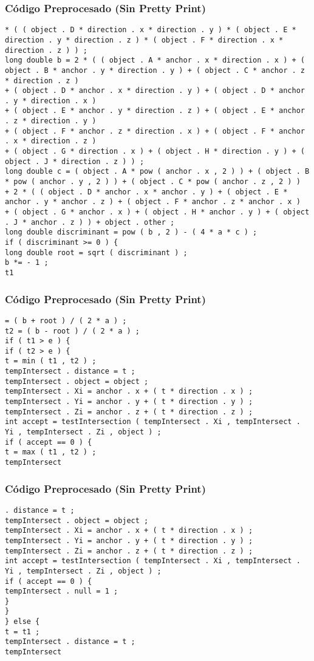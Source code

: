 \documentclass{beamer}
\begin{document}
\begin{frame}[fragile]
\frametitle{C\'odigo Preprocesado (Sin Pretty Print)}
\begin{lstlisting}[style=CStyle]
* ( ( object . D * direction . x * direction . y ) * ( object . E * direction . y * direction . z ) * ( object . F * direction . x * direction . z ) ) ; 
long double b = 2 * ( ( object . A * anchor . x * direction . x ) + ( object . B * anchor . y * direction . y ) + ( object . C * anchor . z * direction . z ) 
+ ( object . D * anchor . x * direction . y ) + ( object . D * anchor . y * direction . x ) 
+ ( object . E * anchor . y * direction . z ) + ( object . E * anchor . z * direction . y ) 
+ ( object . F * anchor . z * direction . x ) + ( object . F * anchor . x * direction . z ) 
+ ( object . G * direction . x ) + ( object . H * direction . y ) + ( object . J * direction . z ) ) ; 
long double c = ( object . A * pow ( anchor . x , 2 ) ) + ( object . B * pow ( anchor . y , 2 ) ) + ( object . C * pow ( anchor . z , 2 ) ) 
+ 2 * ( ( object . D * anchor . x * anchor . y ) + ( object . E * anchor . y * anchor . z ) + ( object . F * anchor . z * anchor . x ) 
+ ( object . G * anchor . x ) + ( object . H * anchor . y ) + ( object . J * anchor . z ) ) + object . other ; 
long double discriminant = pow ( b , 2 ) - ( 4 * a * c ) ; 
if ( discriminant >= 0 ) { 
long double root = sqrt ( discriminant ) ; 
b *= - 1 ; 
t1 \end{lstlisting}
\end{frame}
\begin{frame}[fragile]
\frametitle{C\'odigo Preprocesado (Sin Pretty Print)}
\begin{lstlisting}[style=CStyle]
= ( b + root ) / ( 2 * a ) ; 
t2 = ( b - root ) / ( 2 * a ) ; 
if ( t1 > e ) { 
if ( t2 > e ) { 
t = min ( t1 , t2 ) ; 
tempIntersect . distance = t ; 
tempIntersect . object = object ; 
tempIntersect . Xi = anchor . x + ( t * direction . x ) ; 
tempIntersect . Yi = anchor . y + ( t * direction . y ) ; 
tempIntersect . Zi = anchor . z + ( t * direction . z ) ; 
int accept = testIntersection ( tempIntersect . Xi , tempIntersect . Yi , tempIntersect . Zi , object ) ; 
if ( accept == 0 ) { 
t = max ( t1 , t2 ) ; 
tempIntersect \end{lstlisting}
\end{frame}
\begin{frame}[fragile]
\frametitle{C\'odigo Preprocesado (Sin Pretty Print)}
\begin{lstlisting}[style=CStyle]
. distance = t ; 
tempIntersect . object = object ; 
tempIntersect . Xi = anchor . x + ( t * direction . x ) ; 
tempIntersect . Yi = anchor . y + ( t * direction . y ) ; 
tempIntersect . Zi = anchor . z + ( t * direction . z ) ; 
int accept = testIntersection ( tempIntersect . Xi , tempIntersect . Yi , tempIntersect . Zi , object ) ; 
if ( accept == 0 ) { 
tempIntersect . null = 1 ; 
} 
} 
} else { 
t = t1 ; 
tempIntersect . distance = t ; 
tempIntersect \end{lstlisting}
\end{frame}
\end{document}
